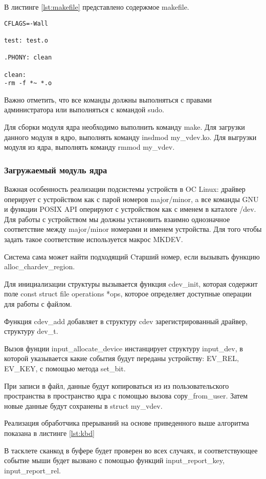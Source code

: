 В листинге \ref{lst:makefile} представлено содержмое makefile.

\begin{lstlisting}[caption=Makefile, label=lst:makefile]
CFLAGS=-Wall

test: test.o

.PHONY: clean

clean:
-rm -f *~ *.o
\end{lstlisting}

Важно отметить, что все команды должны выполняться с правами администратора или выполняться с командой sudo.

Для сборки модуля ядра необходимо выполнить команду make.
Для загрузки данного модуля в ядро, выполнять команду insdmod my\_vdev.ko.
Для выгрузки модуля из ядра, выполнять команду rmmod my\_vdev.

\subsubsection{Загружаемый модуль ядра}
Важная особенность реализации подсистемы устройств в OC Linux: драйвер оперирует с устройством как с парой номеров major/minor, a все команды GNU и функции POSIX API оперируют с устройством как с именем в каталоге /dev. 
Для работы с устройством мы должны установить взаимно однозначное соответствие между major/minor номерами и именем устройства. 
Для того чтобы задать такое соответствие используется макрос MKDEV.

Система сама может найти подходящий Cтарший номер, если вызывать функцию alloc\_chardev\_region.

Для инициализации структуры вызывается функция cdev\_init, которая содержит поле const struct file operations *ops, которое определяет доступные операции для работы с файлом.

Функция cdev\_add добавляет в структуру cdev зарегистрированный драйвер, структуру dev\_t.

Вызов фунции input\_allocate\_device инстанцирует структуру input\_dev, в
которой указывается какие события будут переданы устройству: EV\_REL, EV\_KEY, с помощью метода set\_bit.

При записи в файл, данные будут копироваться из из пользовательского пространства в пространство ядра с помощью вызова сору\_from\_user. 
Затем новые данные будут сохранены в struct my\_vdev.

Реализация обработчика прерываний на основе приведенного выше
алгоритма показана в листинге \ref{lst:kbd}



В тасклете сканкод в буфере будет проверен во всех случаях, и соответствующее событие мыши будет вызвано с помощью функций input\_report\_key, input\_report\_rel. 